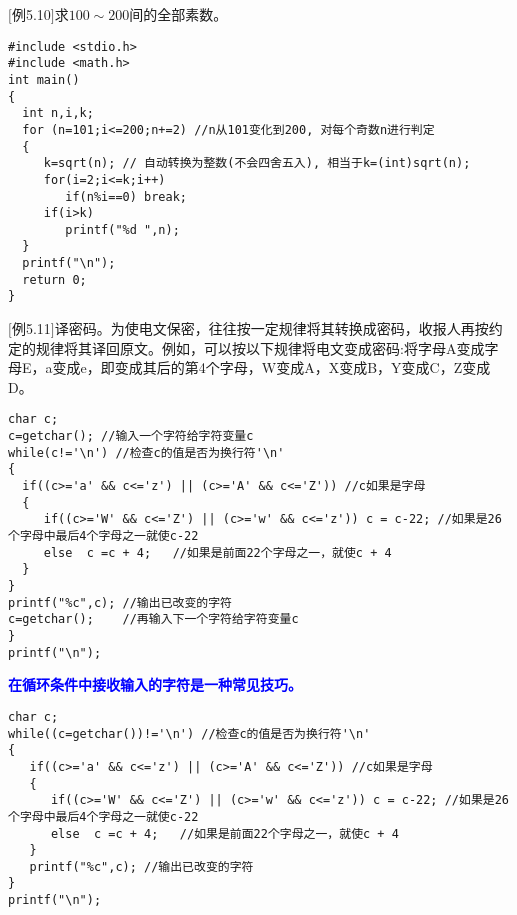 \begin{frame}
\small
$[$例5.10$]$求$100\sim 200$间的全部素数。
\pause
\begin{lstlisting}
#include <stdio.h>
#include <math.h>
int main()
{
  int n,i,k;
  for (n=101;i<=200;n+=2) //n从101变化到200, 对每个奇数n进行判定
  {
     k=sqrt(n); // 自动转换为整数(不会四舍五入), 相当于k=(int)sqrt(n);
     for(i=2;i<=k;i++)
        if(n%i==0) break;
     if(i>k) 
        printf("%d ",n);
  }
  printf("\n");
  return 0;
}
\end{lstlisting}
\end{frame}

\begin{frame}
\small
$[$例5.11$]$译密码。为使电文保密，往往按一定规律将其转换成密码，收报人再按约定的规律将其译回原文。例如，可以按以下规律将电文变成密码:将字母A变成字母E，a变成e，即变成其后的第4个字母，W变成A，X变成B，Y变成C，Z变成D。
\pause
\begin{lstlisting}
char c;
c=getchar(); //输入一个字符给字符变量c
while(c!='\n') //检查c的值是否为换行符'\n'  
{
  if((c>='a' && c<='z') || (c>='A' && c<='Z')) //c如果是字母
  {
     if((c>='W' && c<='Z') || (c>='w' && c<='z')) c = c-22; //如果是26个字母中最后4个字母之一就使c-22
     else  c =c + 4;   //如果是前面22个字母之一，就使c + 4
  }
}
printf("%c",c); //输出已改变的字符
c=getchar();    //再输入下一个字符给字符变量c
}
printf("\n");
\end{lstlisting}
\end{frame}

\begin{frame}
\textbf{\textcolor{blue}{在循环条件中接收输入的字符是一种常见技巧。}}
\begin{lstlisting}
char c;
while((c=getchar())!='\n') //检查c的值是否为换行符'\n'  
{
   if((c>='a' && c<='z') || (c>='A' && c<='Z')) //c如果是字母
   {
      if((c>='W' && c<='Z') || (c>='w' && c<='z')) c = c-22; //如果是26个字母中最后4个字母之一就使c-22
      else  c =c + 4;   //如果是前面22个字母之一，就使c + 4
   }
   printf("%c",c); //输出已改变的字符
}
printf("\n");
\end{lstlisting}
\end{frame}
